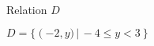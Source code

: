 {
\begin{center}
\\
Relation $D$
\end{center}}
{$D = \{ \left(-2,y) \, | \, -4 \leq y < 3 \right\}$}